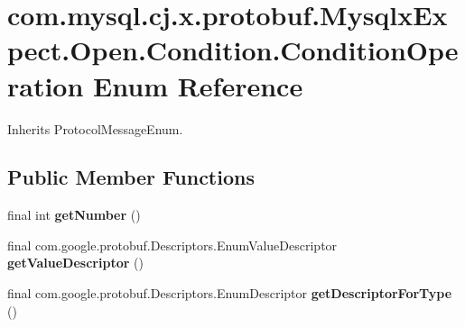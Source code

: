 \hypertarget{enumcom_1_1mysql_1_1cj_1_1x_1_1protobuf_1_1_mysqlx_expect_1_1_open_1_1_condition_1_1_condition_operation}{}\section{com.\+mysql.\+cj.\+x.\+protobuf.\+Mysqlx\+Expect.\+Open.\+Condition.\+Condition\+Operation Enum Reference}
\label{enumcom_1_1mysql_1_1cj_1_1x_1_1protobuf_1_1_mysqlx_expect_1_1_open_1_1_condition_1_1_condition_operation}


Inherits Protocol\+Message\+Enum.

\subsection*{Public Member Functions}
\begin{DoxyCompactItemize}
\item 
\mbox{\label{enumcom_1_1mysql_1_1cj_1_1x_1_1protobuf_1_1_mysqlx_expect_1_1_open_1_1_condition_1_1_condition_operation_abc3ef8b67d80ce8bfee28517286360d4}} 
final int {\bfseries get\+Number} ()
\item 
\mbox{\label{enumcom_1_1mysql_1_1cj_1_1x_1_1protobuf_1_1_mysqlx_expect_1_1_open_1_1_condition_1_1_condition_operation_ab4e3d362cd48ea1db7418809937c5da6}} 
final com.\+google.\+protobuf.\+Descriptors.\+Enum\+Value\+Descriptor {\bfseries get\+Value\+Descriptor} ()
\item 
\mbox{\label{enumcom_1_1mysql_1_1cj_1_1x_1_1protobuf_1_1_mysqlx_expect_1_1_open_1_1_condition_1_1_condition_operation_a36a3123f22d39dedf0da0ef72b1057a1}} 
final com.\+google.\+protobuf.\+Descriptors.\+Enum\+Descriptor {\bfseries get\+Descriptor\+For\+Type} ()
\end{DoxyCompactItemize}
